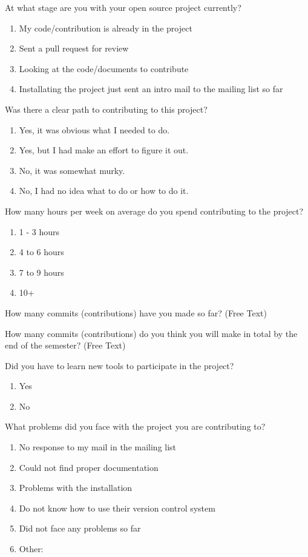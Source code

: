 \begin{table}
At what stage are you with your open source project currently?
\begin{enumerate}
\item My code/contribution is already in the project
\item Sent a pull request for review
\item Looking at the code/documents to contribute
\item Installating the project just sent an intro mail to the mailing list so far
\end{enumerate}

Was there a clear path to contributing to this project?
\begin{enumerate}
\item Yes, it was obvious what I needed to do.
\item Yes, but I had make an effort to figure it out.
\item No, it was somewhat murky.
\item No, I had no idea what to do or how to do it.
\end{enumerate}

How many hours per week on average do you spend contributing to the project?
\begin{enumerate}
\item 1 - 3 hours
\item 4 to 6 hours
\item 7 to 9 hours
\item 10+
\end{enumerate}

How many commits (contributions) have you made so far? (Free Text)

How many commits (contributions) do you think you will make in total by the end of the semester? (Free Text)

Did you have to learn new tools to participate in the project?
\begin{enumerate}
\item Yes
\item No
\end{enumerate}

What problems did you face with the project you are contributing to?
\begin{enumerate}
\item No response to my mail in the mailing list
\item Could not find proper documentation
\item Problems with the installation
\item Do not know how to use their version control system
\item Did not face any problems so far
\item Other:
\end{enumerate}


\end{table}
